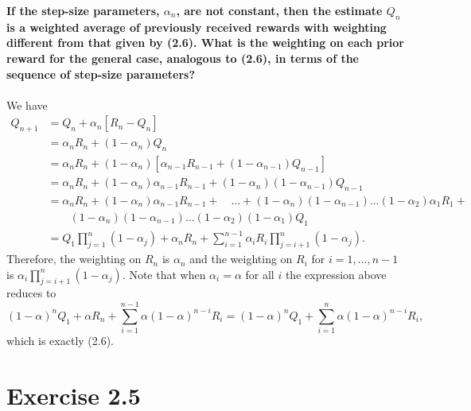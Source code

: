 \documentclass[a4paper,11pt]{article}
\numberwithin{equation}{section}
\theoremstyle{remark}
\begin{document}
\textbf{If the step-size parameters, $\alpha_n$, are not constant, then the estimate $Q_n$ is a weighted average of previously received rewards with weighting different from that given by (2.6). What is the weighting on each prior reward for the general case, analogous to (2.6), in terms of the sequence of step-size parameters?}
\\ \\ 
We have
\begin{align*}
	Q_{n+1} & = Q_n + \alpha_n[R_n - Q_n] \\
			& = \alpha_n R_n + (1-\alpha_n) Q_n \\
			& = \alpha_n R_n + (1-\alpha_n)[\alpha_{n-1} R_{n-1} + (1-\alpha_{n-1}) Q_{n-1}] \\
			& = \alpha_n R_n + (1-\alpha_n)\alpha_{n-1}R_{n-1} + (1-\alpha_n)(1-\alpha_{n-1})Q_{n-1} \\
			& = \alpha_n R_n + (1-\alpha_n)\alpha_{n-1}R_{n-1} + \quad \dots + (1-\alpha_n)(1-\alpha_{n-1})\dots (1-\alpha_2)\alpha_1 R_1 + \\
			& \quad \quad (1-\alpha_n)(1-\alpha_{n-1})\dots (1-\alpha_2)(1-\alpha_1) Q_1 \\
			& = Q_1\prod_{j=1}^{n}(1-\alpha_j) + \alpha_n R_n + \sum_{i=1}^{n-1}\alpha_i R_i \prod_{j=i+1}^{n}(1-\alpha_j).
\end{align*}
Therefore, the weighting on $R_n$ is $\alpha_n$ and the weighting on $R_i$ for $i=1,\dots,n-1$ is $\alpha_i \prod_{j=i+1}^{n}(1-\alpha_j)$. Note that when $\alpha_i = \alpha$ for all $i$ the expression above reduces to
\[
	(1-\alpha)^n Q_1 + \alpha R_n + \sum_{i=1}^{n-1}\alpha(1-\alpha)^{n-i}R_i = (1-\alpha)^n Q_1 + \sum_{i=1}^{n}\alpha(1-\alpha)^{n-i}R_i,
\]
which is exactly (2.6).


\section{Exercise 2.5}
\end{document}
